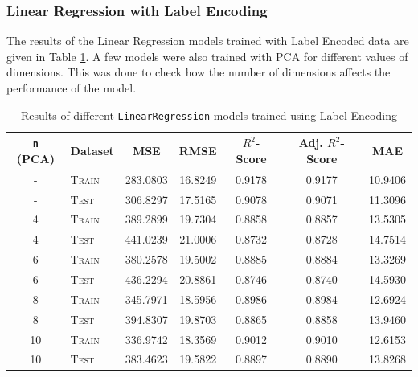 \documentclass[12pt]{article}
\begin{document}
    \subsubsection*{Linear Regression with Label Encoding}
    The results of the Linear Regression models trained with Label Encoded data are given in Table \ref{tab:linear_label}. A few models were also
    trained with PCA for different values of dimensions. This was done to check how the number of dimensions affects the performance of the model.
    \begin{table}[htbp]
        \centering
        \begin{tabular}{|c|l|c|c|c|c|c|}
            \hline
            \texttt{n} (PCA) & Dataset & MSE & RMSE & $R^{2}$-Score & Adj. $R^{2}$-Score & MAE \\
            \hline \hline
            - & \textsc{Train} & 283.0803 & 16.8249 & 0.9178 & 0.9177 & 10.9406 \\
            \hline
            - & \textsc{Test} & 306.8297 & 17.5165 & 0.9078 & 0.9071 & 11.3096 \\
            \hline
            4 & \textsc{Train} & 389.2899 & 19.7304 & 0.8858 & 0.8857 & 13.5305 \\
            \hline
            4 & \textsc{Test} & 441.0239 & 21.0006 & 0.8732 & 0.8728 & 14.7514 \\
            \hline
            6 & \textsc{Train} & 380.2578 & 19.5002 & 0.8885 & 0.8884 & 13.3269 \\
            \hline
            6 & \textsc{Test} & 436.2294 & 20.8861 & 0.8746 & 0.8740 & 14.5930 \\
            \hline
            8 & \textsc{Train} & 345.7971 & 18.5956 & 0.8986 & 0.8984 & 12.6924 \\
            \hline
            8 & \textsc{Test} & 394.8307 & 19.8703 & 0.8865 & 0.8858 & 13.9460 \\
            \hline
            10 & \textsc{Train} & 336.9742 & 18.3569 & 0.9012 & 0.9010 & 12.6153 \\
            \hline
            10 & \textsc{Test} & 383.4623 & 19.5822 & 0.8897 & 0.8890 & 13.8268 \\
            \hline
        \end{tabular}
        \caption{Results of different \texttt{LinearRegression} models trained using Label Encoding}
        \label{tab:linear_label}
    \end{table}
\end{document}
